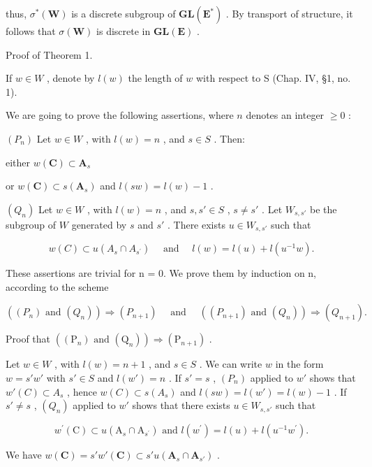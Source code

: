 thus, \(\sigma^{*}(\mathbf{W})\) is a discrete subgroup of \(\mathbf{GL}(\mathbf{E}^{*})\) . By transport of structure, it follows that \(\sigma(\mathbf{W})\) is discrete in \(\mathbf{GL}(\mathbf{E})\) .

Proof of Theorem 1.

If \(w \in W\) , denote by \(l(w)\) the length of \(w\) with respect to S (Chap. IV, §1, no. 1).

We are going to prove the following assertions, where \(n\) denotes an integer \(\geqslant 0\) :

\((P_n)\) Let \(w \in W\) , with \(l(w) = n\) , and \(s \in S\) . Then:

either \(w(\mathbf{C})\subset \mathbf{A}_s\)

or \(w(\mathbf{C}) \subset s(\mathbf{A}_s)\) and \(l(sw) = l(w) - 1\) .

\((Q_n)\) Let \(w \in W\) , with \(l(w) = n\) , and \(s, s' \in S\) , \(s \neq s'\) . Let \(W_{s,s'}\) be the subgroup of \(W\) generated by \(s\) and \(s'\) . There exists \(u \in W_{s,s'}\) such that

\[
w (C) \subset u \left(A _ {s} \cap A _ {s ^ {\prime}}\right) \quad \text { and } \quad l (w) = l (u) + l \left(u ^ {- 1} w\right).
\]

These assertions are trivial for n = 0. We prove them by induction on n, according to the scheme

\[
\left(\left(P _ {n}\right) \text {   and   } \left(Q _ {n}\right)\right) \Longrightarrow \left(P _ {n + 1}\right) \quad \text { and } \quad \left(\left(P _ {n + 1}\right) \text {   and   } \left(Q _ {n}\right)\right) \Longrightarrow \left(Q _ {n + 1}\right).
\]

Proof that \(\left((\mathrm{P}_n)\text{ and } (\mathrm{Q}_n)\right) \Longrightarrow (\mathrm{P}_{n+1})\) .

Let \(w \in W\) , with \(l(w) = n + 1\) , and \(s \in S\) . We can write \(w\) in the form \(w = s'w'\) with \(s' \in S\) and \(l(w') = n\) . If \(s' = s\) , \((P_n)\) applied to \(w'\) shows that \(w'(C) \subset A_s\) , hence \(w(C) \subset s(A_s)\) and \(l(sw) = l(w') = l(w) - 1\) . If \(s' \neq s\) , \((Q_n)\) applied to \(w'\) shows that there exists \(u \in W_{s,s'}\) such that

\[
w ^ {\prime} (\mathrm{C}) \subset u \left(\mathrm{A} _ {s} \cap \mathrm{A} _ {s ^ {\prime}}\right) \text { and } l \left(w ^ {\prime}\right) = l (u) + l \left(u ^ {- 1} w ^ {\prime}\right).
\]

We have \(w(\mathbf{C}) = s'w'(\mathbf{C}) \subset s'u(\mathbf{A}_s \cap \mathbf{A}_{s'})\) .

